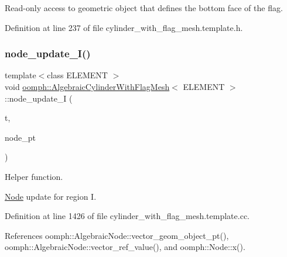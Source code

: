 Read-\/only access to geometric object that defines the bottom face of the flag. 



Definition at line 237 of file cylinder\+\_\+with\+\_\+flag\+\_\+mesh.\+template.\+h.

\mbox{\label{classoomph_1_1AlgebraicCylinderWithFlagMesh_a713cf7c2e1be91eae2667dc3e1fd8644}} 
\subsubsection{\texorpdfstring{node\+\_\+update\+\_\+\+I()}{node\_update\_I()}}
{\footnotesize\ttfamily template$<$class E\+L\+E\+M\+E\+NT $>$ \\
void \hyperlink{classoomph_1_1AlgebraicCylinderWithFlagMesh}{oomph\+::\+Algebraic\+Cylinder\+With\+Flag\+Mesh}$<$ E\+L\+E\+M\+E\+NT $>$\+::node\+\_\+update\+\_\+I (\begin{DoxyParamCaption}\item[{const unsigned \&}]{t,  }\item[{\hyperlink{classoomph_1_1AlgebraicNode}{Algebraic\+Node} $\ast$\&}]{node\+\_\+pt }\end{DoxyParamCaption})\hspace{0.3cm}{\ttfamily [protected]}}



Helper function. 

\hyperlink{classoomph_1_1Node}{Node} update for region I. 

Definition at line 1426 of file cylinder\+\_\+with\+\_\+flag\+\_\+mesh.\+template.\+cc.



References oomph\+::\+Algebraic\+Node\+::vector\+\_\+geom\+\_\+object\+\_\+pt(), oomph\+::\+Algebraic\+Node\+::vector\+\_\+ref\+\_\+value(), and oomph\+::\+Node\+::x().

\mbox{\label{classoomph_1_1AlgebraicCylinderWithFlagMesh_a2717b4ae70a9641c24becc8176410b3e}} 
